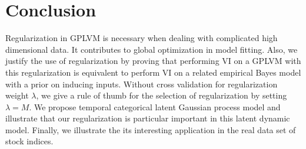 \documentclass{article}
\begin{document}
\section{Conclusion} \label{sec:C}
Regularization in GPLVM is necessary when dealing with complicated high dimensional data. It contributes to global optimization in model fitting. Also, we justify the use of regularization by proving that performing VI on a GPLVM with this regularization is equivalent to perform VI on a related empirical Bayes model with a prior on inducing inputs. Without cross validation for regularization weight $\lambda$, we give a rule of thumb for the selection of regularization by setting $\lambda = M$. We propose temporal categorical latent Gaussian process model and illustrate that our regularization is particular important in this latent dynamic model. Finally, we illustrate the its interesting application in the real data set of stock indices.






















































\newpage
\appendix

\end{document}
